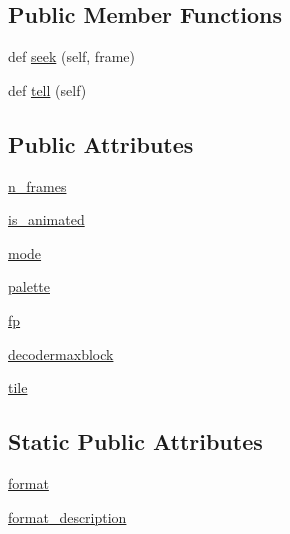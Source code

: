 \subsection*{Public Member Functions}
\begin{DoxyCompactItemize}
\item 
def \hyperlink{classPIL_1_1FliImagePlugin_1_1FliImageFile_a105341faf632e7633113b75f71f7cc41}{seek} (self, frame)
\item 
def \hyperlink{classPIL_1_1FliImagePlugin_1_1FliImageFile_a30ecc8ec3af4b315224c23adfd4d4aeb}{tell} (self)
\end{DoxyCompactItemize}
\subsection*{Public Attributes}
\begin{DoxyCompactItemize}
\item 
\hyperlink{classPIL_1_1FliImagePlugin_1_1FliImageFile_a05a46a4dd4d83fcd41a91b268bc7edb2}{n\+\_\+frames}
\item 
\hyperlink{classPIL_1_1FliImagePlugin_1_1FliImageFile_a46ee383d503e2c5414ae76f3d686c4f5}{is\+\_\+animated}
\item 
\hyperlink{classPIL_1_1FliImagePlugin_1_1FliImageFile_a4b19fa6ef88e2416e6da21c5b8892d8e}{mode}
\item 
\hyperlink{classPIL_1_1FliImagePlugin_1_1FliImageFile_a2f593221efdd6372a4d8b00a4556da0b}{palette}
\item 
\hyperlink{classPIL_1_1FliImagePlugin_1_1FliImageFile_a9ae8c233f8bb0d4a825f54d93353b60b}{fp}
\item 
\hyperlink{classPIL_1_1FliImagePlugin_1_1FliImageFile_ad1c15afb8da7fd78040682193cb059c7}{decodermaxblock}
\item 
\hyperlink{classPIL_1_1FliImagePlugin_1_1FliImageFile_aa355375fb764f4ace7f2c6da2eb6b4ca}{tile}
\end{DoxyCompactItemize}
\subsection*{Static Public Attributes}
\begin{DoxyCompactItemize}
\item 
\hyperlink{classPIL_1_1FliImagePlugin_1_1FliImageFile_a3bc9b56d65108a945964139cc3ec85aa}{format}
\item 
\hyperlink{classPIL_1_1FliImagePlugin_1_1FliImageFile_ab5fce5628284bf63af394f5cb6ebf00b}{format\+\_\+description}
\end{DoxyCompactItemize}


